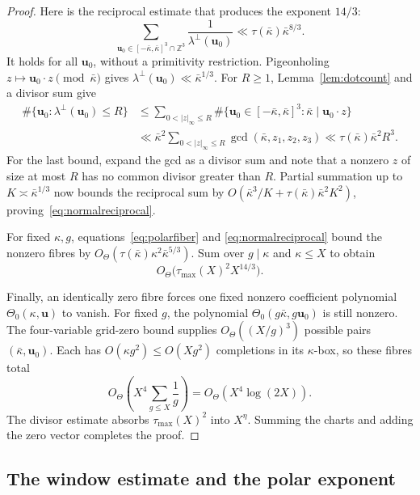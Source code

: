 \documentclass[11pt]{article}
\theoremstyle{definition}
\theoremstyle{remark}
\begin{document}
\begin{proof}
Here is the reciprocal estimate that produces the exponent $14/3$:
\begin{equation}\label{eq:normalreciprocal}
 \sum_{\mathbf u_0\in[-{\bar\kappa},{\bar\kappa}]^3\cap\mathbb Z^3}\frac1{\lambda^\perp(\mathbf u_0)}
 \ll\tau({\bar\kappa}){\bar\kappa}^{8/3}.
\end{equation}
It holds for all $\mathbf u_0$, without a primitivity restriction.
Pigeonholing $z\mapsto \mathbf u_0\cdot z\pmod {\bar\kappa}$ gives $\lambda^\perp(\mathbf u_0)\ll {\bar\kappa}^{1/3}$.
For $R\ge1$, Lemma~\ref{lem:dotcount} and a divisor sum give
\begin{align*}
 \#\{\mathbf u_0:\lambda^\perp(\mathbf u_0)\le R\}
 &\le\sum_{0<|z|_\infty\le R}\#\{\mathbf u_0\in[-{\bar\kappa},{\bar\kappa}]^3:{\bar\kappa}\mid \mathbf u_0\cdot z\}\\
 &\ll {\bar\kappa}^2\sum_{0<|z|_\infty\le R}\gcd({\bar\kappa},z_1,z_2,z_3)
 \ll\tau({\bar\kappa}){\bar\kappa}^2R^3.
\end{align*}
For the last bound, expand the gcd as a divisor sum and note that a
nonzero $z$ of size at most $R$ has no common divisor greater than $R$.
Partial summation up to $K\asymp {\bar\kappa}^{1/3}$ now bounds the reciprocal sum by
$O({\bar\kappa}^3/K+\tau({\bar\kappa}){\bar\kappa}^2K^2)$, proving~\eqref{eq:normalreciprocal}.

For fixed $\kappa,g$, equations~\eqref{eq:polarfiber} and
\eqref{eq:normalreciprocal} bound the nonzero fibres by
$O_\Theta(\tau({\bar\kappa})\kappa^2{\bar\kappa}^{5/3})$. Sum over $g\mid \kappa$ and $\kappa\le X$ to obtain
\[
 O_\Theta\bigl(\tau_{\max}(X)^2X^{14/3}\bigr).
\]

Finally, an identically zero fibre forces one fixed nonzero coefficient
polynomial $\Theta_0(\kappa,\mathbf u)$ to vanish. For fixed $g$, the polynomial
$\Theta_0(g{\bar\kappa},g\mathbf u_0)$ is still nonzero. The four-variable grid-zero bound supplies
$O_\Theta((X/g)^3)$ possible pairs $({\bar\kappa},\mathbf u_0)$. Each has
$O(\kappa g^2)\le O(Xg^2)$ completions in its $\kappa$-box, so these fibres total
\[
 O_\Theta\left(X^4\sum_{g\le X}\frac1g\right)
 =O_\Theta(X^4\log(2X)).
\]
The divisor estimate absorbs $\tau_{\max}(X)^2$ into $X^\eta$.
Summing the charts and adding the zero vector completes the proof.
\end{proof}

\subsection{The window estimate and the polar exponent}
\end{document}
